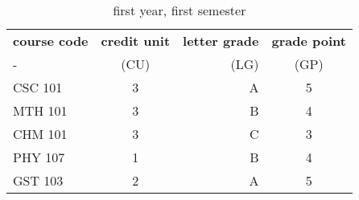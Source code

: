 \documentclass{article}
\begin{document}
	
\begin{table}[h!]
	\begin{center}
		\caption{first year, first semester}
		\label{tab:table1}
		\begin{tabular}{l|c|r|c}
			\textbf{course code} & \textbf{credit unit} & 
			\textbf{letter grade} & \textbf{grade point}\\
			- & (CU) & (LG) & (GP) \\
			\hline
			CSC 101 & 3 & A & 5\\
	    	MTH 101 & 3 & B & 4\\
			CHM 101 & 3 & C & 3\\
			PHY 107 & 1 & B & 4\\
			GST 103 & 2 & A & 5\\
			\end{tabular} 
	\end{center}
\end{table}
\end{document}
